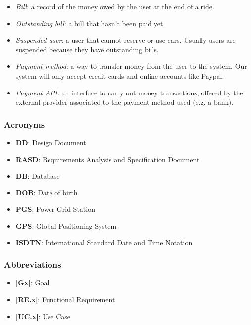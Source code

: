 \documentclass[english]{article}
\begin{document}
\begin{itemize}
\item{\textit{Bill}: a record of the money owed by the user at the end of a ride.}
\item{\textit{Outstanding bill}: a bill that hasn’t been paid yet. }
\item{\textit{Suspended user}: a user that cannot reserve or use cars. Usually users are suspended because they have outstanding bills.}
\item{\textit{Payment method}: a way to transfer money from the user to the system. Our system will only accept credit cards and online accounts like Paypal.}
\item{\textit{Payment API}: an interface to carry out money transactions, offered by the external provider associated to the payment method used (e.g. a bank).}
\end{itemize}

\subsubsection{Acronyms}
\begin{itemize}
\item{\textbf{DD}: Design Document}
\item{\textbf{RASD}: Requirements Analysis and Specification Document}
\item{\textbf{DB}: Database}
\item{\textbf{DOB}: Date of birth}
\item{\textbf{PGS}: Power Grid Station}
\item{\textbf{GPS}: Global Positioning System}
\item{\textbf{ISDTN}: International Standard Date and Time Notation}
\end{itemize}

\subsubsection{Abbreviations}
\begin{itemize}
\item{\textbf{[Gx]}: Goal}
\item{\textbf{[RE.x]}: Functional Requirement}
\item{\textbf{[UC.x]}: Use Case}
\end{itemize}
\end{document}
